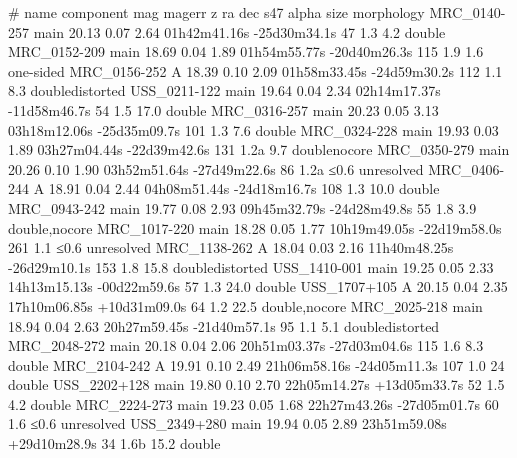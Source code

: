 # name component mag magerr z ra dec s47 alpha size morphology
MRC_0140-257              main    20.13  0.07 2.64 01h42m41.16s -25d30m34.1s 47 1.3 4.2 double
MRC_0152-209              main    18.69  0.04 1.89 01h54m55.77s -20d40m26.3s 115 1.9 1.6 one-sided
MRC_0156-252              A       18.39  0.10 2.09 01h58m33.45s -24d59m30.2s 112 1.1 8.3 doubledistorted
USS_0211-122              main    19.64  0.04 2.34 02h14m17.37s -11d58m46.7s 54 1.5 17.0 double
MRC_0316-257              main    20.23  0.05 3.13 03h18m12.06s -25d35m09.7s 101 1.3 7.6 double
MRC_0324-228              main    19.93  0.03 1.89 03h27m04.44s -22d39m42.6s 131 1.2a 9.7 doublenocore
MRC_0350-279              main    20.26  0.10 1.90 03h52m51.64s -27d49m22.6s 86 1.2a ≤0.6 unresolved
MRC_0406-244              A       18.91  0.04 2.44 04h08m51.44s -24d18m16.7s 108 1.3 10.0 double
MRC_0943-242              main    19.77  0.08 2.93 09h45m32.79s -24d28m49.8s 55 1.8 3.9 double,nocore
MRC_1017-220              main    18.28  0.05 1.77 10h19m49.05s -22d19m58.0s 261 1.1 ≤0.6 unresolved
MRC_1138-262              A       18.04  0.03 2.16 11h40m48.25s -26d29m10.1s 153 1.8 15.8 doubledistorted
USS_1410-001              main    19.25  0.05 2.33 14h13m15.13s -00d22m59.6s 57 1.3 24.0 double
USS_1707+105              A       20.15  0.04 2.35 17h10m06.85s +10d31m09.0s 64 1.2 22.5 double,nocore
MRC_2025-218              main    18.94  0.04 2.63 20h27m59.45s -21d40m57.1s 95 1.1 5.1 doubledistorted
MRC_2048-272              main    20.18  0.04 2.06 20h51m03.37s -27d03m04.6s 115 1.6 8.3 double
MRC_2104-242              A       19.91  0.10 2.49 21h06m58.16s -24d05m11.3s 107 1.0 24 double
USS_2202+128              main    19.80  0.10 2.70 22h05m14.27s +13d05m33.7s 52 1.5 4.2 double
MRC_2224-273              main    19.23  0.05 1.68 22h27m43.26s -27d05m01.7s 60 1.6 ≤0.6 unresolved
USS_2349+280              main    19.94  0.05 2.89 23h51m59.08s +29d10m28.9s 34 1.6b 15.2 double 


